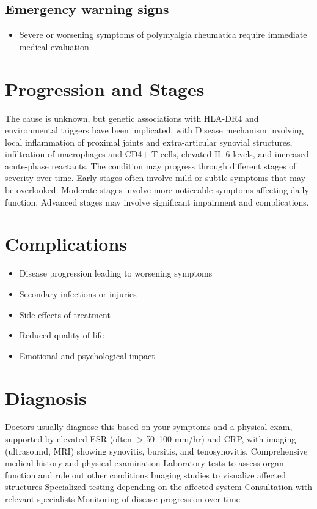\subsection{Emergency warning signs}
\begin{itemize}[noitemsep]
  \item Severe or worsening symptoms of polymyalgia rheumatica require immediate medical evaluation
\end{itemize}
\section{Progression and Stages}
The cause is unknown, but genetic associations with HLA-DR4 and environmental triggers have been implicated, with Disease mechanism involving local inflammation of proximal joints and extra-articular synovial structures, infiltration of macrophages and CD4+ T cells, elevated IL-6 levels, and increased acute-phase reactants. The condition may progress through different stages of severity over time. Early stages often involve mild or subtle symptoms that may be overlooked. Moderate stages involve more noticeable symptoms affecting daily function. Advanced stages may involve significant impairment and complications.
\section{Complications}
\begin{itemize}[noitemsep]
  \item Disease progression leading to worsening symptoms
  \item Secondary infections or injuries
  \item Side effects of treatment
  \item Reduced quality of life
  \item Emotional and psychological impact
\end{itemize}
\section{Diagnosis}
Doctors usually diagnose this based on your symptoms and a physical exam, supported by elevated ESR (often $>$50--100 mm/hr) and CRP, with imaging (ultrasound, MRI) showing synovitis, bursitis, and tenosynovitis. Comprehensive medical history and physical examination Laboratory tests to assess organ function and rule out other conditions Imaging studies to visualize affected structures Specialized testing depending on the affected system Consultation with relevant specialists Monitoring of disease progression over time

